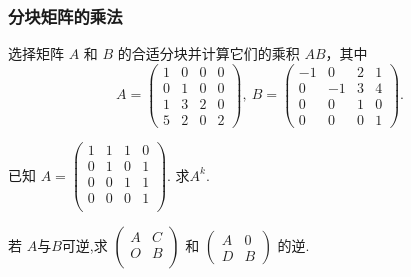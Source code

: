 \begin{frame}\frametitle{分块矩阵的乘法}
\begin{example}
选择矩阵 $A$ 和 $B$ 的合适分块并计算它们的乘积 $AB$，其中
\[A = \left(\begin{array}{cccc}
1 & 0 & 0 & 0\\
0 & 1 & 0 & 0\\
1 & 3 & 2 & 0\\
5 & 2 & 0 & 2
\end{array}\right),\ B = \left(\begin{array}{cccc}
- 1 & 0 & 2 & 1\\
0 & - 1 & 3 & 4\\
0 & 0 & 1 & 0\\
0 & 0 & 0 & 1
\end{array}\right).\]
\end{example}
\pp
\begin{example}
已知 $A = \left(\begin{array}{cccc}
1 & 1 & 1 & 0\\
0 & 1 & 0 & 1\\
0 & 0 & 1 & 1\\
0 & 0 & 0 & 1\\
\end{array}\right)$. 求$A^k$.
\end{example}
\pp
{}
\begin{example}
若 $A$与$B$可逆,求 $\begin{pmatrix}A & C \\ O & B\\\end{pmatrix}$ 和 $\begin{pmatrix}A & 0  \\ D & B\end{pmatrix}$ 的逆.
\end{example}
\end{frame}



